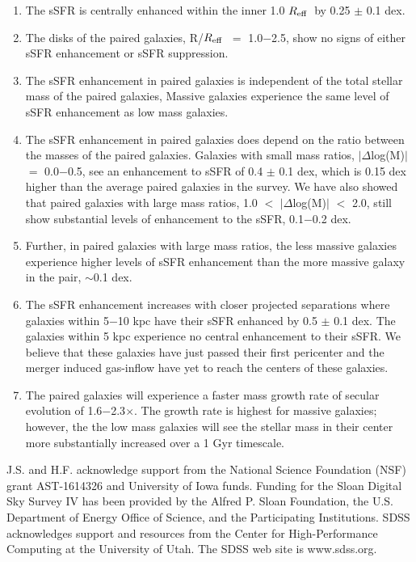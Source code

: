 \documentclass[iop,revtex4,twocolumn,apj,numberedappendix,appendixfloats]{emulateapj}
\newcommand{\reff}{$R_{\rm eff}$}
\begin{document}
\begin{enumerate}
\item The sSFR is centrally enhanced within the inner 1.0 \reff\ by 0.25 $\pm$ 0.1 dex. 
\item The disks of the paired galaxies, R/\reff\ $=$ 1.0$-$2.5, show no signs of either sSFR enhancement or sSFR suppression. 
\item The sSFR enhancement in paired galaxies is independent of the total stellar mass of the paired galaxies, Massive galaxies experience the same level of sSFR enhancement as low mass galaxies.
\item The sSFR enhancement in paired galaxies does depend on the ratio between the masses of the paired galaxies. Galaxies with small mass ratios, $|\Delta$log(M)$|$ $=$ 0.0$-$0.5, see an enhancement to sSFR of 0.4 $\pm$ 0.1 dex, which is 0.15 dex higher than the average paired galaxies in the survey. We have also showed that paired galaxies with large mass ratios, 1.0 $<$ $|\Delta$log(M)$|$ $<$ 2.0, still show substantial levels of enhancement to the sSFR, 0.1$-$0.2 dex. 
\item Further, in paired galaxies with large mass ratios, the less massive galaxies experience higher levels of sSFR enhancement than the more massive galaxy in the pair, $\sim$0.1 dex.
\item The sSFR enhancement increases with closer projected separations where galaxies within 5$-$10 kpc have their sSFR enhanced by 0.5 $\pm$ 0.1 dex. The galaxies within 5 kpc experience no central enhancement to their sSFR. We believe that these galaxies have just passed their first pericenter and the merger induced gas-inflow have yet to reach the centers of these galaxies.
\item The paired galaxies will experience a faster mass growth rate of secular evolution of 1.6$-$2.3$\times$. The growth rate is highest for massive galaxies; however, the the low mass galaxies will see the stellar mass in their center more substantially increased over a 1 Gyr timescale. 

\end{enumerate}

\acknowledgments

J.S. and H.F. acknowledge support from the National Science Foundation (NSF) grant AST-1614326 and University of Iowa funds. Funding for the Sloan Digital Sky Survey IV has been provided by the Alfred P. Sloan Foundation, the U.S. Department of Energy Office of Science, and the Participating Institutions. SDSS acknowledges support and resources from the Center for High-Performance Computing at the University of Utah. The SDSS web site is www.sdss.org.
\end{document}
